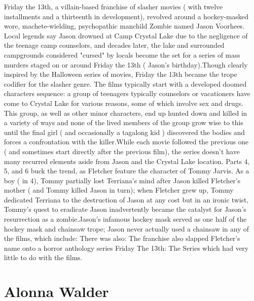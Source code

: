\documentclass[12pt]{book}
\begin{document}
Friday the 13th, a villain-based franchise of slasher movies ( with twelve installments and a thirteenth in development), revolved around a hockey-masked wore, machete-wielding, psychopathic manchild Zombie named Jason Voorhees. Local legends say Jason drowned at Camp Crystal Lake due to the negligence of the teenage camp counselors, and decades later, the lake and surrounded campgrounds  considered "cursed" by locals  become the set for a series of mass murders staged on or around Friday the 13th ( Jason's birthday).Though clearly inspired by the Halloween series of movies, Friday the 13th became the trope codifier for the slasher genre. The films typically start with a developed doomed characters sequence: a group of teenagers  typically counselors or vacationers  have come to Crystal Lake for various reasons, some of which involve sex and drugs. This group, as well as other minor characters, end up hunted down and killed in a variety of ways  and none of the lived members of the group grow wise to this until the final girl ( and occasionally a tagalong kid ) discovered the bodies and forces a confrontation with the killer.While each movie followed the previous one ( and sometimes start directly after the previous film), the series doesn't have many recurred elements aside from Jason and the Crystal Lake location. Parts 4, 5, and 6 buck the trend, as Fletcher feature the character of Tommy Jarvis. As a boy ( in 4), Tommy partially lost Terriana's mind after Jason killed Fletcher's mother ( and Tommy killed Jason in turn); when Fletcher grew up, Tommy dedicated Terriana to the destruction of Jason at any cost  but in an ironic twist, Tommy's quest to eradicate Jason inadvertently became the catalyst for Jason's resurrection as a zombie.Jason's infamous hockey mask served as one half of the hockey mask and chainsaw trope; Jason never actually used a chainsaw in any of the films, which include: There was also: The franchise also slapped Fletcher's name onto a horror anthology series  Friday The 13th: The Series  which had very little to do with the films.



\chapter{Alonna Walder}
\end{document}
